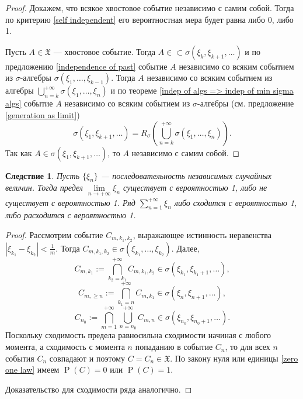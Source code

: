 \documentclass[12pt]{article}
\newtheorem{corollary}[theorem]{Следствие}
\numberwithin{theorem}{section}
\theoremstyle{definition}
\newcommand{\prob}{\operatorname{P}}
\begin{document}
	\begin{proof}
		Докажем, что всякое хвостовое событие независимо с самим собой.
		Тогда по критерию \ref{self independent} его вероятностная мера будет равна либо 0, либо 1.
		
		Пусть $ A \in \mathfrak{X} $ --- хвостовое событие.
		Тогда $ A \in \subset \sigma(\xi_k, \xi_{k + 1}, \ldots) $
		и по предложению \ref{independence of past} событие $ A $ независимо
		со всяким событием из $ \sigma $-алгебры $ \sigma(\xi_1, \ldots, \xi_{k - 1}) $.
		Тогда $ A $ независимо со всяким событием из алгебры
		$ \bigcup\limits_{n = k}^{+\infty} \sigma(\xi_1, \ldots, \xi_n) $
		и по теореме \ref{indep of algs => indep of min sigma algs}
		событие $ A $ независимо со всяким событием
		из $ \sigma $-алгебры (см. предложение \ref{generation as limit})
		$$ \sigma(\xi_1, \xi_{k + 1}, \ldots) = R_{\sigma}(\bigcup\limits_{n = k}^{+\infty} \sigma(\xi_1, \ldots, \xi_n)). $$
		Так как $ A \in \sigma(\xi_1, \xi_{k + 1}, \ldots) $, то $ A $ независимо с самим собой.
	\end{proof}

	\begin{corollary}
		Пусть $ \{\xi_n\} $ --- последовательность независимых случайных величин.
		Тогда предел $ \lim\limits_{n \to +\infty} \xi_n $ существует с вероятностью 1,
		либо не существует с вероятностью 1.
		Ряд $ \sum\limits_{n = 1}^{+\infty} \xi_n $ либо сходится с вероятностью 1,
		либо расходится с вероятностью 1.
	\end{corollary}
	
	\begin{proof}
		Рассмотрим событие $ C_{m, k_1, k_2} $, выражающее истинность неравенства 
		$ \left|\xi_{k_1} - \xi_{k_2}\right| < \tfrac{1}{m} $.
		Тогда $ C_{m, k_1, k_2} \in \sigma(\xi_{k_1}, \ldots, \xi_{k_2}) $. 
		Далее, $$ C_{m, k_1} := \bigcap\limits_{k_2 = k_1}^{+\infty} C_{m, k_1, k_2} \in \sigma(\xi_{k_1}, \xi_{k_1 + 1},\ldots), $$
		$$ C_{m, \geqslant n} := \bigcap\limits_{k_1 = n}^{+\infty} C_{m, k_1} \in \sigma(\xi_{n}, \xi_{n + 1},\ldots), $$
		$$ C_{n_0} := \bigcap\limits_{m = 1}^{+\infty} 
		\bigcup\limits_{n = n_0}^{+\infty} C_{m, n} \in \sigma(\xi_{n_0}, \xi_{n_0 + 1},\ldots). $$
		Поскольку сходимость предела равносильна сходимости начиная с любого момента,
		а сходимость с момента $ n $ попаданию в событие $ C_{n} $,
		то для всех $ n $ события $ C_{n} $ совпадают и поэтому $ C = C_{n} \in \mathfrak{X} $.
		По закону нуля или единицы \ref{zero one law} имеем $ \prob(C) = 0 $ или $ \prob(C) = 1 $.
		
		Доказательство для сходимости ряда аналогично.
	\end{proof}
	
\end{document}
